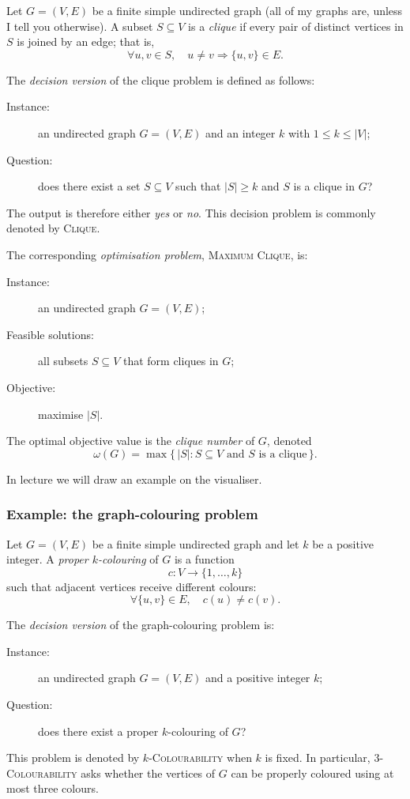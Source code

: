 \documentclass[11pt]{article}
\begin{document}
Let $G=(V,E)$ be a finite simple undirected graph (all of my graphs are, unless I tell you otherwise). A subset $S\subseteq V$ is a
\emph{clique} if every pair of distinct vertices in $S$ is joined by an edge;
that is,
\[
    \forall u,v\in S,\quad u\neq v \Longrightarrow \{u,v\}\in E.
\]

The \emph{decision version} of the clique problem is defined as follows:
\begin{description}
    \item[Instance:] an undirected graph $G=(V,E)$ and an integer
    $k$ with $1\leq k\leq |V|$;
    \item[Question:] does there exist a set $S\subseteq V$ such that
    $|S|\geq k$ and $S$ is a clique in $G$?
\end{description}
The output is therefore either \emph{yes} or \emph{no}. This decision problem
is commonly denoted by \textsc{Clique}.

The corresponding \emph{optimisation problem}, \textsc{Maximum Clique}, is:
\begin{description}
    \item[Instance:] an undirected graph $G=(V,E)$;
    \item[Feasible solutions:] all subsets $S\subseteq V$ that form cliques in
    $G$;
    \item[Objective:] maximise $|S|$.
\end{description}
The optimal objective value is the \emph{clique number} of $G$, denoted
\[
    \omega(G)=\max\{\,|S|:S\subseteq V \text{ and } S \text{ is a clique}\,\}.
\]

In lecture we will draw an example on the visualiser. 


\subsubsection{Example: the graph-colouring problem}

Let $G=(V,E)$ be a finite simple undirected graph and let $k$ be a positive
integer. A \emph{proper $k$-colouring} of $G$ is a function
\[
    c:V\longrightarrow \{1,\ldots,k\}
\]
such that adjacent vertices receive different colours:
\[
    \forall\{u,v\}\in E,\quad c(u)\neq c(v).
\]

The \emph{decision version} of the graph-colouring problem is:
\begin{description}
    \item[Instance:] an undirected graph $G=(V,E)$ and a positive integer $k$;
    \item[Question:] does there exist a proper $k$-colouring of $G$?
\end{description}
This problem is denoted by \textsc{$k$-Colourability} when $k$ is fixed. In
particular, \textsc{3-Colourability} asks whether the vertices of $G$ can be
properly coloured using at most three colours.
\end{document}
